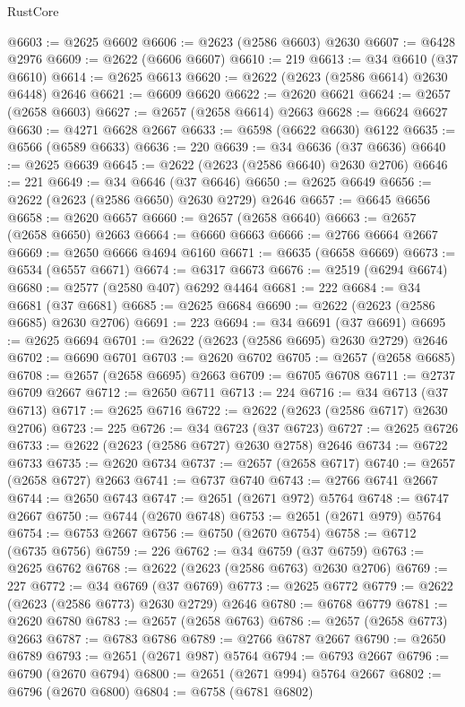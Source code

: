 \begin{lexlean}{RustCore}
\begin{coremodule}
@6603 := @2625 @6602
@6606 := @2623 (@2586 @6603) @2630
@6607 := @6428 @2976
@6609 := @2622 (@6606 @6607)
@6610 := 219
@6613 := @34 @6610 (@37 @6610)
@6614 := @2625 @6613
@6620 := @2622 (@2623 (@2586 @6614) @2630 @6448) @2646
@6621 := @6609 @6620
@6622 := @2620 @6621
@6624 := @2657 (@2658 @6603)
@6627 := @2657 (@2658 @6614) @2663
@6628 := @6624 @6627
@6630 := @4271 @6628 @2667
@6633 := @6598 (@6622 @6630) @6122
@6635 := @6566 (@6589 @6633)
@6636 := 220
@6639 := @34 @6636 (@37 @6636)
@6640 := @2625 @6639
@6645 := @2622 (@2623 (@2586 @6640) @2630 @2706)
@6646 := 221
@6649 := @34 @6646 (@37 @6646)
@6650 := @2625 @6649
@6656 := @2622 (@2623 (@2586 @6650) @2630 @2729) @2646
@6657 := @6645 @6656
@6658 := @2620 @6657
@6660 := @2657 (@2658 @6640)
@6663 := @2657 (@2658 @6650) @2663
@6664 := @6660 @6663
@6666 := @2766 @6664 @2667
@6669 := @2650 @6666 @4694 @6160
@6671 := @6635 (@6658 @6669)
@6673 := @6534 (@6557 @6671)
@6674 := @6317 @6673
@6676 := @2519 (@6294 @6674)
@6680 := @2577 (@2580 @407) @6292 @4464
@6681 := 222
@6684 := @34 @6681 (@37 @6681)
@6685 := @2625 @6684
@6690 := @2622 (@2623 (@2586 @6685) @2630 @2706)
@6691 := 223
@6694 := @34 @6691 (@37 @6691)
@6695 := @2625 @6694
@6701 := @2622 (@2623 (@2586 @6695) @2630 @2729) @2646
@6702 := @6690 @6701
@6703 := @2620 @6702
@6705 := @2657 (@2658 @6685)
@6708 := @2657 (@2658 @6695) @2663
@6709 := @6705 @6708
@6711 := @2737 @6709 @2667
@6712 := @2650 @6711
@6713 := 224
@6716 := @34 @6713 (@37 @6713)
@6717 := @2625 @6716
@6722 := @2622 (@2623 (@2586 @6717) @2630 @2706)
@6723 := 225
@6726 := @34 @6723 (@37 @6723)
@6727 := @2625 @6726
@6733 := @2622 (@2623 (@2586 @6727) @2630 @2758) @2646
@6734 := @6722 @6733
@6735 := @2620 @6734
@6737 := @2657 (@2658 @6717)
@6740 := @2657 (@2658 @6727) @2663
@6741 := @6737 @6740
@6743 := @2766 @6741 @2667
@6744 := @2650 @6743
@6747 := @2651 (@2671 @972) @5764
@6748 := @6747 @2667
@6750 := @6744 (@2670 @6748)
@6753 := @2651 (@2671 @979) @5764
@6754 := @6753 @2667
@6756 := @6750 (@2670 @6754)
@6758 := @6712 (@6735 @6756)
@6759 := 226
@6762 := @34 @6759 (@37 @6759)
@6763 := @2625 @6762
@6768 := @2622 (@2623 (@2586 @6763) @2630 @2706)
@6769 := 227
@6772 := @34 @6769 (@37 @6769)
@6773 := @2625 @6772
@6779 := @2622 (@2623 (@2586 @6773) @2630 @2729) @2646
@6780 := @6768 @6779
@6781 := @2620 @6780
@6783 := @2657 (@2658 @6763)
@6786 := @2657 (@2658 @6773) @2663
@6787 := @6783 @6786
@6789 := @2766 @6787 @2667
@6790 := @2650 @6789
@6793 := @2651 (@2671 @987) @5764
@6794 := @6793 @2667
@6796 := @6790 (@2670 @6794)
@6800 := @2651 (@2671 @994) @5764 @2667
@6802 := @6796 (@2670 @6800)
@6804 := @6758 (@6781 @6802)

\end{coremodule}
\end{lexlean}
